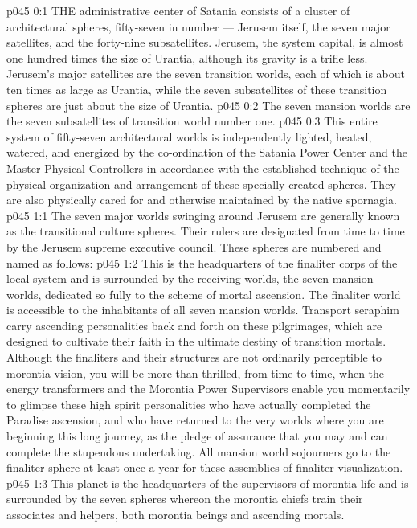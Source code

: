 \vs p045 0:1 THE administrative center of Satania consists of a cluster of architectural spheres, fifty\hyp{}seven in number --- Jerusem itself, the seven major satellites, and the forty\hyp{}nine subsatellites. Jerusem, the system capital, is almost one hundred times the size of Urantia, although its gravity is a trifle less. Jerusem’s major satellites are the seven transition worlds, each of which is about ten times as large as Urantia, while the seven subsatellites of these transition spheres are just about the size of Urantia.
\vs p045 0:2 The seven mansion worlds are the seven subsatellites of transition world number one.
\vs p045 0:3 This entire system of fifty\hyp{}seven architectural worlds is independently lighted, heated, watered, and energized by the co\hyp{}ordination of the Satania Power Center and the Master Physical Controllers in accordance with the established technique of the physical organization and arrangement of these specially created spheres. They are also physically cared for and otherwise maintained by the native spornagia.
\vs p045 1:1 The seven major worlds swinging around Jerusem are generally known as the transitional culture spheres. Their rulers are designated from time to time by the Jerusem supreme executive council. These spheres are numbered and named as follows:
\vs p045 1:2 \pc {} This is the headquarters of the finaliter corps of the local system and is surrounded by the receiving worlds, the seven mansion worlds, dedicated so fully to the scheme of mortal ascension. The finaliter world is accessible to the inhabitants of all seven mansion worlds. Transport seraphim carry ascending personalities back and forth on these pilgrimages, which are designed to cultivate their faith in the ultimate destiny of transition mortals. Although the finaliters and their structures are not ordinarily perceptible to morontia vision, you will be more than thrilled, from time to time, when the energy transformers and the Morontia Power Supervisors enable you momentarily to glimpse these high spirit personalities who have actually completed the Paradise ascension, and who have returned to the very worlds where you are beginning this long journey, as the pledge of assurance that you may and can complete the stupendous undertaking. All mansion world sojourners go to the finaliter sphere at least once a year for these assemblies of finaliter visualization.
\vs p045 1:3 \pc {} This planet is the headquarters of the supervisors of morontia life and is surrounded by the seven spheres whereon the morontia chiefs train their associates and helpers, both morontia beings and ascending mortals.
